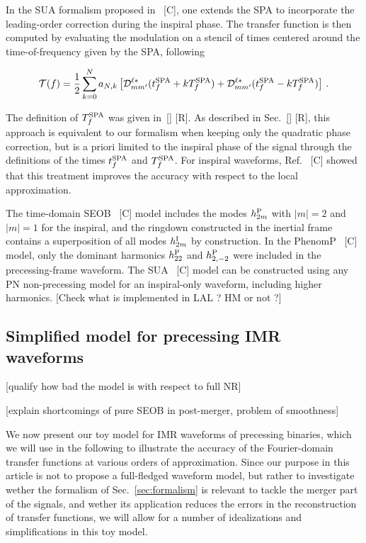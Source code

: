 \documentclass[aps,showpacs,twocolumn,
prd,superscriptaddress,nofootinbib]{revtex4-1}
\newcommand{\be}{\begin{equation}}
\newcommand{\ee}{\end{equation}}
\newcommand\calT{{\mathcal{T}}}
\newcommand\calD{{\mathcal{D}}}
\newcommand{\SM}[1]{{\color{Red} #1}}
\begin{document}
In the SUA formalism proposed in~\cite{} \SM{[C]}, one extends the SPA to incorporate the leading-order correction during the inspiral phase. The transfer function is then computed by evaluating the modulation on a stencil of times centered around the time-of-frequency given by the SPA, following 
\begin{widetext}
\be
	\calT(f) = \frac{1}{2} \sum\limits_{k=0}^{N} a_{N,k} \left[\calD^{\ell *}_{mm'}(t_{f}^{\rm SPA} + k T_{f}^{\rm SPA}) + \calD^{\ell *}_{mm'}(t_{f}^{\rm SPA} - k T_{f}^{\rm SPA}) \right] \,.
\ee
\end{widetext}
The definition of $T_{f}^{\rm SPA}$ was given in~\ref{} \SM{[R]}. As described in Sec.~\ref{} \SM{[R]}, this approach is equivalent to our formalism when keeping only the quadratic phase correction, but is a priori limited to the inspiral phase of the signal through the definitions of the times $t^{\rm SPA}_{f}$ and $T^{\rm SPA}_{f}$. For inspiral waveforms, Ref.~\cite{} \SM{[C]} showed that this treatment improves the accuracy with respect to the local approximation.

The time-domain SEOB~\cite{} \SM{[C]} model includes the modes $h^{\rm P}_{2m}$ with $|m|=2$ and $|m|=1$ for the inspiral, and the ringdown constructed in the inertial frame contains a superposition of all modes $h^{\rm I}_{2 m}$ by construction. In the PhenomP~\cite{} \SM{[C]} model, only the dominant harmonics $h^{\rm P}_{22}$ and $h^{\rm P}_{2,-2}$ were included in the precessing-frame waveform. The SUA~\cite{} \SM{[C]} model can be constructed using any PN non-precessing model for an inspiral-only waveform, including higher harmonics. \SM{[Check what is implemented in LAL ? HM or not ?]}

\subsection{Simplified model for precessing IMR waveforms}
\label{subsec:precmodel}

\SM{[qualify how bad the model is with respect to full NR]}

\SM{[explain shortcomings of pure SEOB in post-merger, problem of smoothness]}

We now present our toy model for IMR waveforms of precessing binaries, which we will use in the following to illustrate the accuracy of the Fourier-domain transfer functions at various orders of approximation. Since our purpose in this article is not to propose a full-fledged waveform model, but rather to investigate wether the formalism of Sec.~\ref{sec:formalism} is relevant to tackle the merger part of the signals, and wether its application reduces the errors in the reconstruction of transfer functions, we will allow for a number of idealizations and simplifications in this toy model.
\end{document}
